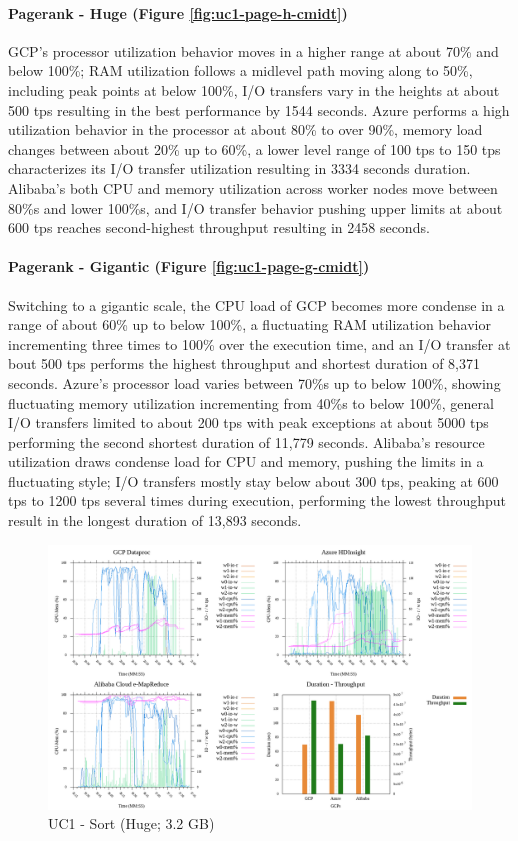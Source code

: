 \documentclass[review]{elsarticle}
\begin{document}
\paragraph{Pagerank - Huge (Figure \ref{fig:uc1-page-h-cmidt})}GCP's processor utilization behavior moves in a higher range at about 70\% and below 100\%; RAM utilization follows a midlevel path moving along to 50\%, including peak points at below 100\%, I/O transfers vary in the heights at about 500 tps resulting in the best performance by 1544 seconds. Azure performs a high utilization behavior in the processor at about 80\% to over 90\%, memory load changes between about 20\% up to 60\%, a lower level range of 100 tps to 150 tps characterizes its I/O transfer utilization resulting in 3334 seconds duration. Alibaba's both CPU and memory utilization across worker nodes move between 80\%s and lower 100\%s, and I/O transfer behavior pushing upper limits at about 600 tps reaches second-highest throughput resulting in 2458 seconds.

\paragraph{Pagerank - Gigantic (Figure \ref{fig:uc1-page-g-cmidt})}Switching to a gigantic scale, the CPU load of GCP becomes more condense in a range of about 60\% up to below 100\%, a fluctuating RAM utilization behavior incrementing three times to 100\% over the execution time, and an I/O transfer at bout 500 tps performs the highest throughput and shortest duration of 8,371 seconds. Azure's processor load varies between 70\%s up to below 100\%, showing fluctuating memory utilization incrementing from 40\%s to below 100\%, general I/O transfers limited to about 200 tps with peak exceptions at about 5000 tps performing the second shortest duration of 11,779 seconds. Alibaba's resource utilization draws condense load for CPU and memory, pushing the limits in a fluctuating style; I/O transfers mostly stay below about 300 tps, peaking at 600 tps to 1200 tps several times during execution, performing the lowest throughput result in the longest duration of 13,893 seconds.

\begin{figure}[p]
	\caption{UC1 - Sort (Huge; 3.2 GB)}
	\label{fig:uc1-srt-h-cmidt}
	\includegraphics[width=\textwidth]{uc1-srt-h-cmidt}
	\centering
\end{figure}
\end{document}
